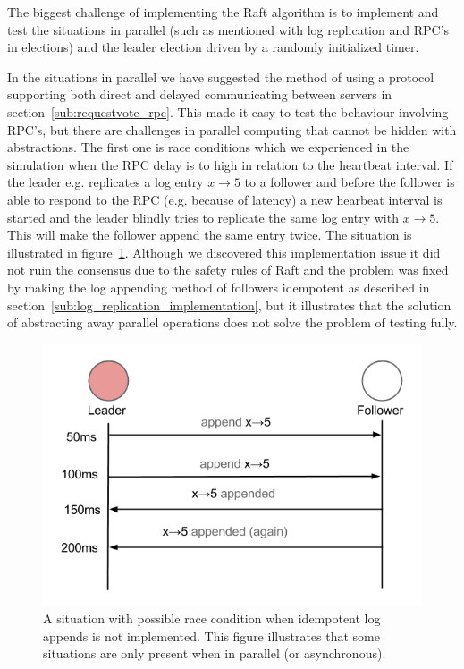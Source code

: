 The biggest challenge of implementing the Raft algorithm is to implement and test the situations in parallel (such as mentioned with log replication and RPC's in elections) and the leader election driven by a randomly initialized timer.

In the situations in parallel we have suggested the method of using a protocol supporting both direct and delayed communicating between servers in section~\ref{sub:requestvote_rpc}. This made it easy to test the behaviour involving RPC's, but there are challenges in parallel computing that cannot be hidden with abstractions. The first one is race conditions which we experienced in the simulation when the RPC delay is to high in relation to the heartbeat interval. If the leader e.g. replicates a log entry $x\rightarrow5$ to a follower and before the follower is able to respond to the RPC (e.g. because of latency) a new hearbeat interval is started and the leader blindly tries to replicate the same log entry with $x\rightarrow5$. This will make the follower append the same entry twice. The situation is illustrated in figure~\ref{fig:replication_race_condition}. Although we discovered this implementation issue it did not ruin the consensus due to the safety rules of Raft and the problem was fixed by making the log appending method of followers idempotent as described in section~\ref{sub:log_replication_implementation}, but it illustrates that the solution of abstracting away parallel operations does not solve the problem of testing fully.

\begin{figure}
\centering
\includegraphics[scale = 0.4]{figures/replication_race_condition.png}
\caption{A situation with possible race condition when idempotent log appends is not implemented. This figure illustrates that some situations are only present when in parallel (or asynchronous).}
\label{fig:replication_race_condition}
\end{figure}

